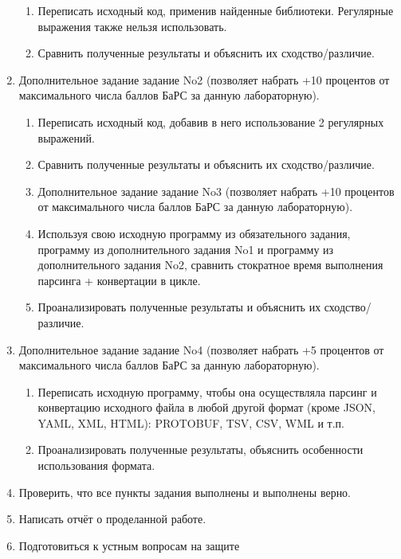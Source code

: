 \begin{enumerate}
\begin{enumerate}
                  \item Переписать исходный код, применив найденные
                        библиотеки. Регулярные выражения также нельзя
                        использовать.
                  \item Сравнить полученные результаты и объяснить их
                        сходство/различие.
            \end{enumerate}
      \item Дополнительное задание задание No2 (позволяет набрать +10
            процентов от максимального числа баллов БаРС за данную
            лабораторную).
            \begin{enumerate}
                  \item Переписать исходный код, добавив в него использование
                        2
                        регулярных выражений.
                  \item Сравнить полученные результаты и объяснить их
                        сходство/различие.
                  \item Дополнительное задание задание No3 (позволяет набрать +10
                        процентов от максимального числа баллов БаРС за данную
                        лабораторную).
                  \item Используя свою исходную программу из обязательного
                        задания, программу из дополнительного задания No1 и
                        программу из дополнительного задания No2, сравнить
                        стократное время выполнения парсинга + конвертации в
                        цикле.
                  \item Проанализировать полученные результаты и объяснить их
                        сходство/различие.
            \end{enumerate}
      \item  Дополнительное задание задание No4 (позволяет набрать +5
            процентов от максимального числа баллов БаРС за данную
            лабораторную).
            \begin{enumerate}
                  \item  Переписать исходную программу, чтобы она осуществляла
                        парсинг и конвертацию исходного файла в любой другой
                        формат (кроме JSON, YAML, XML, HTML): PROTOBUF,
                        TSV, CSV, WML и т.п.
                  \item  Проанализировать полученные результаты, объяснить
                        особенности использования формата.
            \end{enumerate}
      \item  Проверить, что все пункты задания выполнены и выполнены верно.
      \item  Написать отчёт о проделанной работе.
      \item  Подготовиться к устным вопросам на защите
\end{enumerate}

